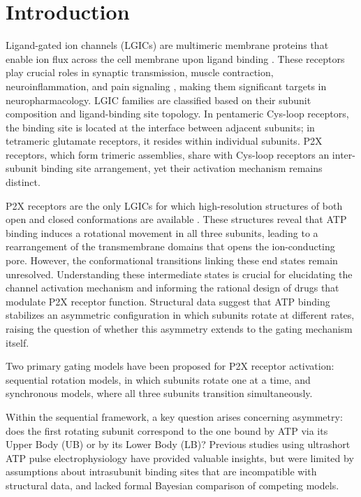 \documentclass[pdflatex,sn-mathphys-num]{sn-jnl}%
\theoremstyle{thmstyleone}%
\theoremstyle{thmstyletwo}%
\theoremstyle{thmstylethree}%
\begin{document}
\section{Introduction}
Ligand-gated ion channels (LGICs) are multimeric membrane proteins that enable ion flux across the cell membrane upon ligand binding \cite{Changeux2008}. These receptors play crucial roles in synaptic transmission, muscle contraction, neuroinflammation, and pain signaling \cite{Traynelis2010, North2006, Bartlett2014}, making them significant targets in neuropharmacology. LGIC families are classified based on their subunit composition and ligand-binding site topology. In pentameric Cys-loop receptors, the binding site is located at the interface between adjacent subunits; in tetrameric glutamate receptors, it resides within individual subunits. P2X receptors, which form trimeric assemblies, share with Cys-loop receptors an inter-subunit binding site arrangement, yet their activation mechanism remains distinct.

P2X receptors are the only LGICs for which high-resolution structures of both open and closed conformations are available \cite{Hattori2012, Kasuya2017, Mansoor2016}. These structures reveal that ATP binding induces a rotational movement in all three subunits, leading to a rearrangement of the transmembrane domains that opens the ion-conducting pore. However, the conformational transitions linking these end states remain unresolved. Understanding these intermediate states is crucial for elucidating the channel activation mechanism and informing the rational design of drugs that modulate P2X receptor function. Structural data suggest that ATP binding stabilizes an asymmetric configuration in which subunits rotate at different rates, raising the question of whether this asymmetry extends to the gating mechanism itself. 

Two primary gating models have been proposed for P2X receptor activation: sequential rotation models, in which subunits rotate one at a time, and synchronous models, where all three subunits transition simultaneously.  Within the sequential framework, a key question arises concerning asymmetry: does the first rotating subunit correspond to the one bound by ATP via its Upper Body (UB) or by its Lower Body (LB)? Previous studies using ultrashort ATP pulse electrophysiology \cite{Moffatt2007, Jones2008} have provided valuable insights, but were limited by assumptions about intrasubunit binding sites that are incompatible with structural data, and lacked formal Bayesian comparison of competing models.
\end{document}
